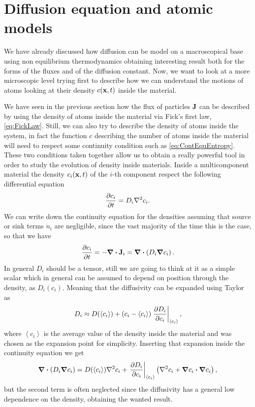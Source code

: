 \section{Diffusion equation and atomic models}

We have already discussed how diffusion can be model on a macroscopical base using non equilibrium thermodynamics obtaining interesting result both for the forms of the fluxes and of the diffusion constant. Now, we want to look at a more microscopic level trying first to describe how we can understand the motions of atoms looking at their density $c(\vb{x}, t)$ inside the material.

We have seen in the previous section how the flux of particles $\vb{J}$ can be described by using the density of atoms inside the material via Fick's first law, \eqref{eq:FickLaw}. Still, we can also try to describe the density of atoms inside the system, in fact the function $c$ describing the number of atoms inside the material will need to respect some continuity condition such as \eqref{eq:ContEquEntropy}. These two conditions taken together allow us to obtain a really powerful tool in order to study the evolution of density inside materials.
{
    Inside a multicomponent material the density $c_i(\vb{x}, t)$ of the $i$-th component respect the following differential equation
    \begin{equation}
        \label{eq:SecFickLaw}
        \pdv{c_i}{t} = D_i \laplacian c_i.
    \end{equation}
}
{
    We can write down the continuity equation for the densities assuming that source or sink terms $\dot{n}_i$ are negligible, since the vast majority of the time this is the case, so that we have
    \begin{equation}
        \pdv{c_i}{t} = -\grad\vdot\vb{J}_i = \grad\vdot\left( D_i\grad c_i \right).
    \end{equation}
    In general $D_i$ should be a tensor, still we are going to think at it as a simple scalar which in general can be assumed to depend on position through the density, as $D_i(c_i)$. Meaning that the diffusivity can be expanded using Taylor as
    \begin{equation}
        D_i \approx D(\left\langle c_i \right\rangle) + \left( c_i - \left\langle c_i \right\rangle \right)\eval{\pdv{D_i}{c_i}}_{\left\langle c_i \right\rangle},
    \end{equation}
    where $\left\langle c_i \right\rangle$ is the average value of the density inside the material and was chosen as the expansion point for simplicity. Inserting that expansion inside the continuity equation we get
    \begin{equation}
        \grad\vdot\left( D_i\grad c_i \right) = D(\left\langle c_i \right\rangle)\laplacian c_i + \eval{\pdv{D_i}{c_i}}_{\left\langle c_i \right\rangle} \left( \laplacian c_i + \grad c_i \vdot \grad c_i \right),
    \end{equation}
    but the second term is often neglected since the diffusivity has a general low dependence on the density, obtaining the wanted result.
}


